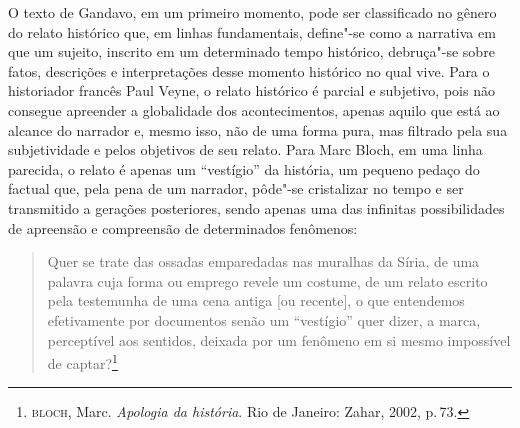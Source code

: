O texto de Gandavo, em um primeiro momento, pode ser classificado no gênero do relato histórico que, em linhas fundamentais, define"-se como a narrativa em que um sujeito, inscrito em um determinado tempo histórico, debruça"-se sobre fatos, descrições e interpretações desse momento histórico no qual vive. Para o historiador francês Paul Veyne, o relato histórico é parcial e subjetivo, pois não consegue apreender a globalidade dos acontecimentos, apenas
aquilo que está ao alcance do narrador e, mesmo isso, não de uma forma pura, mas filtrado pela sua subjetividade e pelos objetivos de seu relato.
Para Marc Bloch, em uma linha parecida, o relato é apenas um ``vestígio'' da história, um pequeno pedaço do factual que, pela pena de um narrador, pôde"-se cristalizar no tempo e ser transmitido a gerações posteriores, sendo apenas uma das infinitas possibilidades de apreensão e compreensão de determinados fenômenos:

\begin{quote}
Quer se trate das ossadas
emparedadas nas muralhas da Síria, de uma palavra cuja forma ou emprego revele um
costume, de um relato escrito pela testemunha de uma cena antiga [ou recente], o que
entendemos efetivamente por documentos senão um ``vestígio'' quer dizer, a marca,
perceptível aos sentidos, deixada por um fenômeno em si mesmo impossível de captar?\footnote{\textsc{bloch}, Marc. \textit{Apologia da história}. Rio de Janeiro: Zahar, 2002, p.\,73.}
\end{quote}

